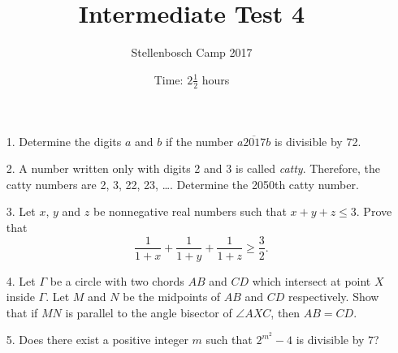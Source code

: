 \documentclass[12pt]{article}
\title{Intermediate Test 4}
\author{Stellenbosch Camp 2017}
\date{Time: $2\frac{1}{2}$ hours}
\begin{document}
 \maketitle

\begin{enumerate}

\item[1.] %
Determine the digits $a$ and $b$ if the number $\overline{a2017b}$ is divisible by 72.


\item[2.] %
A number written only with digits 2 and 3 is called \emph{catty}. Therefore, the catty numbers are 2, 3, 22, 23, \ldots. Determine the 2050th catty number.


\item[3.] %
Let $x$, $y$ and $z$ be nonnegative real numbers such that $x+y+z \leq 3$. Prove that
	\[ \frac{1}{1+x} +\frac{1}{1+y} +\frac{1}{1+z} \geq \frac{3}{2}. \]


\item[4.] %
Let $\Gamma$ be a circle with two chords $AB$ and $CD$ which intersect at point $X$ inside $\Gamma$. Let $M$ and $N$ be the midpoints of $AB$ and $CD$ respectively. Show that if $MN$ is parallel to the angle bisector of $\angle AXC$, then $AB = CD$.
 

\item[5.] %
Does there exist a positive integer $m$ such that $2^{m^2} - 4$ is divisible by $7$?


\end{enumerate}
\end{document}
